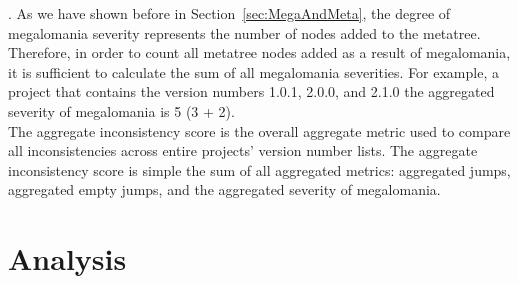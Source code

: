 \documentclass[conference]{IEEEtran}
\begin{document}
.  
As we have shown before in Section~\ref{sec:MegaAndMeta}, the degree of megalomania severity represents the number of nodes added to the metatree.
Therefore, in order to count all metatree nodes added as a result of megalomania, it is sufficient to calculate the sum of all megalomania severities.
For example, a project that contains the version numbers 1.0.1, 2.0.0, and 2.1.0 the aggregated severity of megalomania is 5 (3 + 2). \\


% 

The aggregate inconsistency score is the overall aggregate metric used to compare all inconsistencies across entire projects' version number lists.
The aggregate inconsistency score is simple the sum of all aggregated metrics: aggregated jumps, aggregated empty jumps, and the aggregated severity of megalomania. 


\section{Analysis}

\subsection{\RQOne}

\begin{table*}[htb]
\begin{adjustbox}{width=\textwidth}
\end{adjustbox}
\end{table*}
\end{document}
